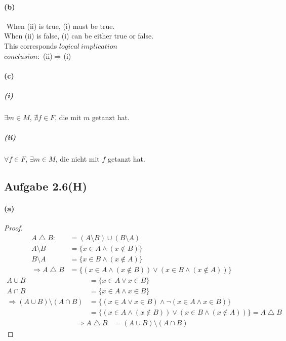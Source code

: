 \paragraph{(b)}
$ $\newline
When (ii) is true, (i) must be true.\\
When (ii) is false, (i) can be either true or false.\\
This corresponds $logical\ implication$\\
$conclusion:$ (ii)$\Rightarrow$(i)

\paragraph{(c)}

\subparagraph{(i)}
$\exists m\in M$, $\nexists f\in F$, die mit $m$ getanzt hat.

\subparagraph{(ii)}
$\forall f\in F$, $\exists m\in M$, die nicht mit $f$ getanzt hat.

\newpage

\subsection{Aufgabe 2.6(H)}

\paragraph{(a)}
\begin{proof}
$ $\newline
\begin{align}
A\bigtriangleup B:&=(A\setminus B)\cup(B\setminus A)\\
A\setminus B&=\{x\in A\wedge(x\notin B)\}\\
B\setminus A&=\{x\in B\wedge(x\notin A)\}\\
\Rightarrow A\bigtriangleup B&=\{(x\in A\wedge(x\notin B))\vee(x\in B\wedge(x\notin A))\}
\end{align}
\begin{align}
A\cup B&=\{x\in A\vee x\in B\}\\
A\cap B&=\{x\in A\wedge x\in B\}\\
\Rightarrow (A\cup B)\setminus(A\cap B)&=\{(x\in A\vee x\in B)\wedge\neg(x\in A\wedge x\in B)\}\\
&=\{(x\in A\wedge(x\notin B))\vee(x\in B\wedge(x\notin A))\}=A\bigtriangleup B
\end{align}
\begin{align}
\Rightarrow A\bigtriangleup B&=(A\cup B)\setminus(A\cap B)
\end{align}
\end{proof}

